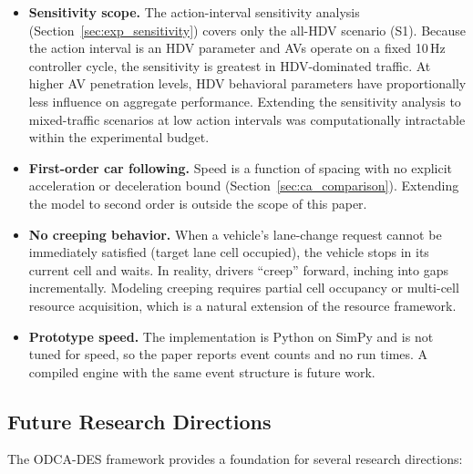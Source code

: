 \documentclass[review,number]{elsarticle}
\begin{document}
\begin{itemize}
    \item \textbf{Sensitivity scope.} The action-interval sensitivity analysis (Section~\ref{sec:exp_sensitivity}) covers only the all-HDV scenario (S1). Because the action interval is an HDV parameter and AVs operate on a fixed 10\,Hz controller cycle, the sensitivity is greatest in HDV-dominated traffic. At higher AV penetration levels, HDV behavioral parameters have proportionally less influence on aggregate performance. Extending the sensitivity analysis to mixed-traffic scenarios at low action intervals was computationally intractable within the experimental budget.

    \item \textbf{First-order car following.} Speed is a function of spacing with no explicit acceleration or deceleration bound (Section~\ref{sec:ca_comparison}). Extending the model to second order is outside the scope of this paper.

    \item \textbf{No creeping behavior.} When a vehicle's lane-change request cannot be immediately satisfied (target lane cell occupied), the vehicle stops in its current cell and waits. In reality, drivers ``creep'' forward, inching into gaps incrementally. Modeling creeping requires partial cell occupancy or multi-cell resource acquisition, which is a natural extension of the resource framework.
    \item \textbf{Prototype speed.} The implementation is Python on SimPy and is not tuned for speed, so the paper reports event counts and no run times. A compiled engine with the same event structure is future work.
\end{itemize}

\subsection{Future Research Directions}

The ODCA-DES framework provides a foundation for several research directions:
\end{document}
